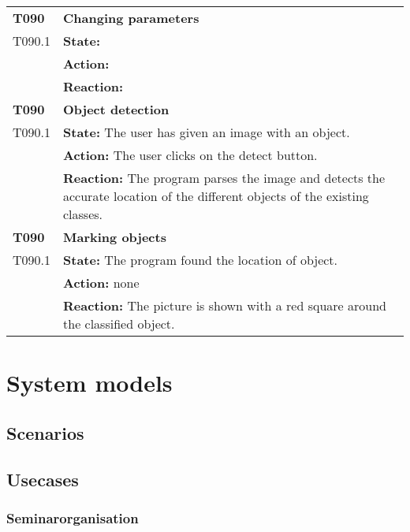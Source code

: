 \documentclass[parskip=full]{scrartcl}
\begin{document}
\begin{tabular}{p{2cm}p{12cm}}
\textbf{T090} & \textbf{Changing parameters}\\
T090.1 & \textbf{State:} \\
& \textbf{Action:} \\
& \textbf{Reaction:} \\

\textbf{T090} & \textbf{Object detection}\\
T090.1 & \textbf{State:} The user has given an image with an object.\\
& \textbf{Action:} The user clicks on the detect button.\\
& \textbf{Reaction:} The program parses the image and detects the accurate location of the different objects of the existing classes.\\

\textbf{T090} & \textbf{Marking objects}\\
T090.1 & \textbf{State:} The program found the location of object.\\
& \textbf{Action:} none \\
& \textbf{Reaction:} The picture is shown with a red square around the classified object.\\

\end{tabular}

\section{System models}

\subsection{Scenarios}
\subsection{Usecases}
\subsubsection{Seminarorganisation}
\end{document}
